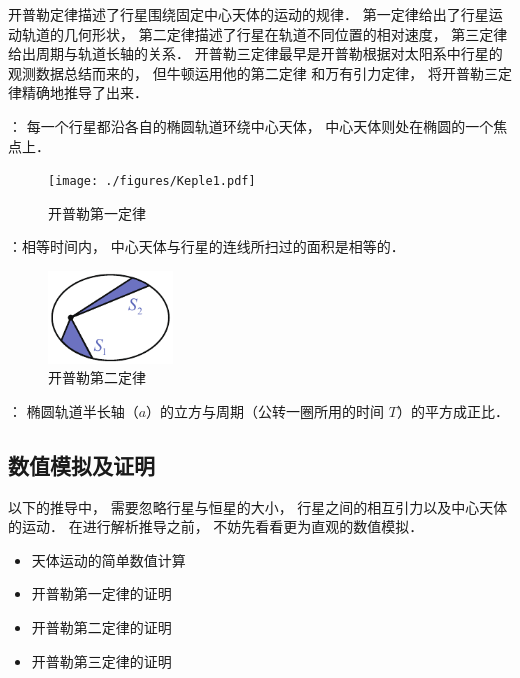 

开普勒定律描述了行星围绕固定中心天体的运动的规律． 第一定律给出了行星运动轨道的几何形状， 第二定律描述了行星在轨道不同位置的相对速度， 第三定律给出周期与轨道长轴的关系． 开普勒三定律最早是开普勒根据对太阳系中行星的观测数据总结而来的， 但牛顿运用他的第二定律 和万有引力定律， 将开普勒三定律精确地推导了出来．

： 每一个行星都沿各自的椭圆轨道环绕中心天体， 中心天体则处在椭圆的一个焦点上．
\begin{figure}[ht]
\centering
\texttt{[image: ./figures/Keple1.pdf]}
\caption{开普勒第一定律} \label{Keple_fig1}
\end{figure}

：相等时间内， 中心天体与行星的连线所扫过的面积是相等的．
\begin{figure}[ht]
\centering
\includegraphics[width=3.3cm]{./figures/Keple2.pdf}
\caption{开普勒第二定律} \label{Keple_fig2}
\end{figure}

： 椭圆轨道半长轴（$a$）的立方与周期（公转一圈所用的时间 $T$）的平方成正比．

\subsection{数值模拟及证明}

以下的推导中， 需要忽略行星与恒星的大小， 行星之间的相互引力以及中心天体的运动． 在进行解析推导之前， 不妨先看看更为直观的数值模拟．
 
\begin{itemize}
\item 天体运动的简单数值计算
\item 开普勒第一定律的证明
\item 开普勒第二定律的证明
\item 开普勒第三定律的证明
\end{itemize}
 
